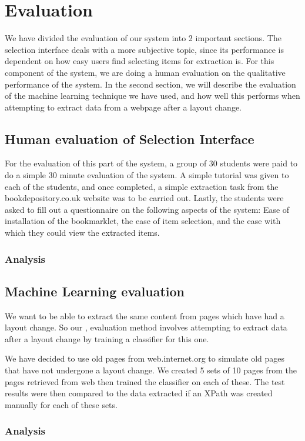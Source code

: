 \chapter{Evaluation}

We have divided the evaluation of our system into 2 important sections. The selection interface
deals with a more subjective topic, since its performance is dependent on how easy users find 
selecting items for extraction is. For this component of the system, we are doing a human
evaluation on the qualitative performance of the system. In the second section, we will describe
the evaluation of the machine learning technique we have used, and how well this performs when
attempting to extract data from a webpage after a layout change.

\section{Human evaluation of Selection Interface}

For the evaluation of this part of the system, a group of 30 students were paid to do a simple 30
minute evaluation of the system. A simple tutorial was given to each of the students, and once
completed, a simple extraction task from the bookdepository.co.uk website was to be carried out.
Lastly, the students were asked to fill out a questionnaire on the following aspects of the
system: Ease of installation of the bookmarklet, the ease of item selection, and the ease with
which they could view the extracted items.
\subsection{Analysis}

\section{Machine Learning evaluation}
 We want to be able to extract the same content from pages which have had a layout change. So our
 , evaluation method involves attempting to extract data after a layout change by training a
 classifier for this one.
 
 We have decided to use old pages from web.internet.org to simulate old pages that have not
 undergone 
 a layout change. We created 5 sets of 10 pages from the pages retrieved from web then trained 
 the classifier on each of these. The test results were then compared to the data extracted if an
 XPath was created manually for each of these sets.
\subsection{Analysis} 